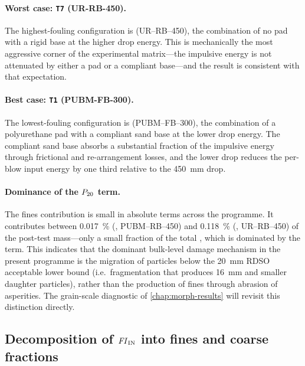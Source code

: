 \paragraph{Worst case: \texttt{T7} (UR-RB-450).}
The highest-fouling configuration is 
(\gls{UR}--\gls{RB}--450), the combination of no pad with a rigid base at
the higher drop energy. This is mechanically the most aggressive corner of
the experimental matrix---the impulsive energy is not attenuated by either
a pad or a compliant base---and the result is consistent with that
expectation.

\paragraph{Best case: \texttt{T1} (PUBM-FB-300).}
The lowest-fouling configuration is 
(\gls{PUBM}--\gls{FB}--300), the combination of a polyurethane pad with a
compliant sand base at the lower drop energy. The compliant sand base
absorbs a substantial fraction of the impulsive energy through frictional
and re-arrangement losses, and the lower drop reduces the per-blow input
energy by one third relative to the \SI{450}{\milli\metre} drop.

\paragraph{Dominance of the \texorpdfstring{$P_{20}$}{P20} term.}
The fines contribution \PoneM{} is small in absolute terms across the
programme. It contributes between \SI{0.017}{\percent} (,
\gls{PUBM}--\gls{RB}--450) and \SI{0.118}{\percent} (,
\gls{UR}--\gls{RB}--450) of the post-test mass---only a small fraction of
the total \FIIN, which is dominated by the \PtwoM{} term. This indicates
that the dominant bulk-level damage mechanism in the present programme is
the migration of particles below the \SI{20}{\milli\metre} \gls{RDSO}
acceptable lower bound (i.e.\ fragmentation that produces
\SI{16}{\milli\metre} and smaller daughter particles), rather than the
production of fines through abrasion of asperities. The grain-scale
diagnostic of \cref{chap:morph-results} will revisit this distinction
directly.

\subsection{Decomposition of \texorpdfstring{$\mathit{FI}_{\mathrm{IN}}$}{FI\_IN} into fines and coarse fractions}
\label{sec:imp-decomposition}

